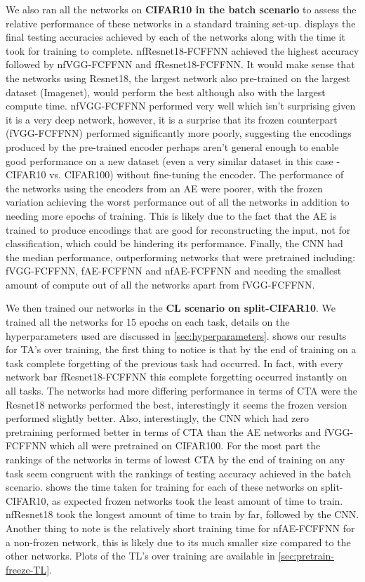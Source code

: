 We also ran all the networks on \textbf{CIFAR10 in the batch scenario} to assess the relative performance of these networks in a standard training set-up.  displays the final testing accuracies achieved by each of the networks along with the time it took for training to complete. nfResnet18-FCFFNN achieved the highest accuracy followed by nfVGG-FCFFNN and fResnet18-FCFFNN. It would make sense that the networks using Resnet18, the largest network also pre-trained on the largest dataset (Imagenet), would perform the best although also with the largest compute time. nfVGG-FCFFNN performed very well which isn't surprising given it is a very deep network, however, it is a surprise that its frozen counterpart (fVGG-FCFFNN) performed significantly more poorly, suggesting the encodings produced by the pre-trained encoder perhaps aren't general enough to enable good performance on a new dataset (even a very similar dataset in this case - CIFAR10 vs. CIFAR100) without fine-tuning the encoder. The performance of the networks using the encoders from an AE were poorer, with the frozen variation achieving the worst performance out of all the networks in addition to needing more epochs of training. This is likely due to the fact that the AE is trained to produce encodings that are good for reconstructing the input, not for classification, which could be hindering its performance. Finally, the CNN had the median performance, outperforming networks that were pretrained including: fVGG-FCFFNN, fAE-FCFFNN and nfAE-FCFFNN and needing the smallest amount of compute out of all the networks apart from fVGG-FCFFNN.

We then trained our networks in the \textbf{CL scenario on split-CIFAR10}. We trained all the networks for 15 epochs on each task, details on the hyperparameters used are discussed in \cref{sec:hyperparameters}.  shows our results for TA's over training, the first thing to notice is that by the end of training on a task complete forgetting of the previous task had occurred. In fact, with every network bar fResnet18-FCFFNN this complete forgetting occurred instantly on all tasks. The networks had more differing performance in terms of CTA were the Resnet18 networks performed the best, interestingly it seems the frozen version performed slightly better. Also, interestingly, the CNN which had zero pretraining performed better in terms of CTA than the AE networks and fVGG-FCFFNN which all were pretrained on CIFAR100. For the most part the rankings of the networks in terms of lowest CTA by the end of training on any task seem congruent with the rankings of testing accuracy achieved in the batch scenario.  shows the time taken for training for each of these networks on split-CIFAR10, as expected frozen networks took the least amount of time to train. nfResnet18 took the longest amount of time to train by far, followed by the CNN. Another thing to note is the relatively short training time for nfAE-FCFFNN for a non-frozen network, this is likely due to its much smaller size compared to the other networks. Plots of the TL's over training are available in \cref{sec:pretrain-freeze-TL}.

